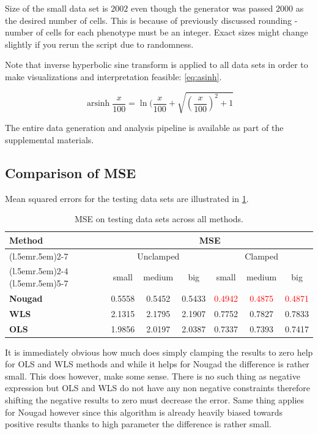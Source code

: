 Size of the small data set is $2002$ even though the generator was passed $2000$ as the desired number of cells. This is because of previously discussed rounding - number of cells for each phenotype must be an integer. Exact sizes might change slightly if you rerun the script due to randomness.

Note that inverse hyperbolic sine transform\cite{asinh} is applied to all data sets in order to make visualizations and interpretation feasible: \cref{eq:asinh}.

\begin{equation}
\operatorname{arsinh} \frac{x}{100}=\ln (\frac{x}{100} + \sqrt{(\frac{x}{100})^2 + 1} 
\label{eq:asinh}
\end{equation}

The entire data generation and analysis pipeline is available as part of the supplemental materials.

\subsection{Comparison of MSE}

Mean squared errors for the testing data sets are illustrated in \cref{tab:MSEtb}.

\begin{table}[]
\begin{tabular}{lcccccc} \toprule 
\multirow{3}{*}{Method}  & \multicolumn{6}{c}{MSE}\\ 
\cmidrule(l{.5em}r{.5em}){2-7}
{}& \multicolumn{3}{c}{Unclamped}& \multicolumn{3}{c}{Clamped}\\
\cmidrule(l{.5em}r{.5em}){2-4}
\cmidrule(l{.5em}r{.5em}){5-7}
{} & small & medium & big  & small   & medium   & big\\
\midrule
\textbf{Nougad} & 0.5558  & 0.5452 & 0.5433 & \textcolor{red}{0.4942} & \textcolor{red}{0.4875}  & \textcolor{red}{0.4871}  \\
\textbf{WLS} & 2.1315 & 2.1795  & 2.1907  & 0.7752   & 0.7827 & 0.7833 \\
\textbf{OLS} & 1.9856  & 2.0197 & 2.0387  & 0.7337   & 0.7393 & 0.7417 \\
\bottomrule
\end{tabular}
\label{tab:MSEtb}
\caption{MSE on testing data sets across all methods.}
\end{table}

It is immediately obvious how much does simply clamping the results to zero help for OLS and WLS methods and while it helps for Nougad the difference is rather small. This does however, make some sense. There is no such thing as negative expression but OLS and WLS do not have any non negative constraints therefore shifting the negative results to zero must decrease the error. Same thing applies for Nougad however since this algorithm is already heavily biased towards positive results thanks to high  parameter the difference is rather small. 

